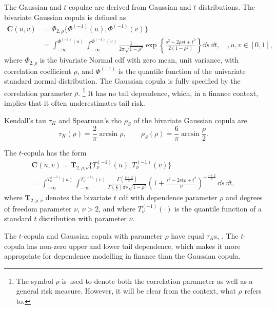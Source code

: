 \documentclass[11pt,a4paper,english]{article}
\begin{document}
The Gaussian and $t$ copulae are derived from Gaussian and $t$
distributions. 
The bivariate Gaussian copula is defined as
\begin{align*}
  \bm{C}(u,v) &= \Phi_{2, \rho}\{\Phi^{(-1)}(u), \Phi^{(-1)}(v)\} \nonumber \\
              &= \int_{-\infty}^{\Phi^{(-1)}(u)}
                \int_{-\infty}^{\Phi^{(-1)}(v)}
                \frac{1}{2\pi\sqrt{1-\rho^2}}
                \exp{\left\{
                \frac{s^2-2\rho st+t^2}{2(1-\rho^2)}
                \right\}} \dd s\, \dd t,\quad, u,v\in [0,1],
\end{align*}
where $\Phi_{2, \rho}$ is the bivariate Normal cdf
with zero mean, unit variance, with correlation coefficient $\rho$, and
$\Phi^{(-1)}$ is the quantile function of the univariate standard normal
distribution.
The Gaussian copula is fully specified by the correlation parameter $\rho$. \footnote{
The symbol $\rho$ is used to denote both the correlation parameter as
well as a general risk measure. However, it will be clear from the
context, what $\rho$ refers to.}
It has no tail dependence, which, in a finance context, implies that
it often underestimates tail risk.  

Kendall's tau $\tau_K$ and Spearman's rho $\rho_S$ of the bivariate Gaussian copula are
    \begin{equation*}
        \tau_K(\rho) = \frac{2}{\pi}\arcsin\rho, \quad\quad
        \rho_S(\rho) = \frac{6}{\pi}\arcsin\frac{\rho}{2}.
        \end{equation*}

The $t$-copula has the form
\begin{multline*}
        \bm{C}(u,v) = \bm{T}_{2, \rho, \nu}\{T^{(-1)}_\nu(u), T^{(-1)}_\nu(v)\}\\
        = \int_{-\infty}^{T^{(-1)}_\nu(u)}
               \int_{-\infty}^{T^{(-1)}_\nu(v)}
            \frac{\Gamma\left(\frac{\nu+2}{2}\right)}
            {\Gamma\left(\frac{\nu}{2}\right)\pi\nu\sqrt{1-\rho^2}}
             \left(
        1+\frac{s^2-2st\rho+t^2}{\nu}
        \right)^{-\frac{\nu+2}{2}}\, \dd s\, \dd t,
    \end{multline*}
where $\bm{T}_{2, \rho, \nu}$ denotes the 
bivariate $t$ cdf with dependence parameter $\rho$ and degrees of
freedom parameter $\nu$, $\nu>2$,
and where $T^{(-1)}_\nu(\cdot)$ is the quantile function of a standard
$t$ distribution with parameter $\nu$. 

The $t$-copula and Gaussian copula with parameter $\rho$ have equal $\tau_K$s, \citep[see][and references therein]{demarta2005t}.
The $t$-copula has non-zero upper and lower tail dependence, which makes it more appropriate for dependence modelling in finance than the Gaussian copula.
\end{document}
